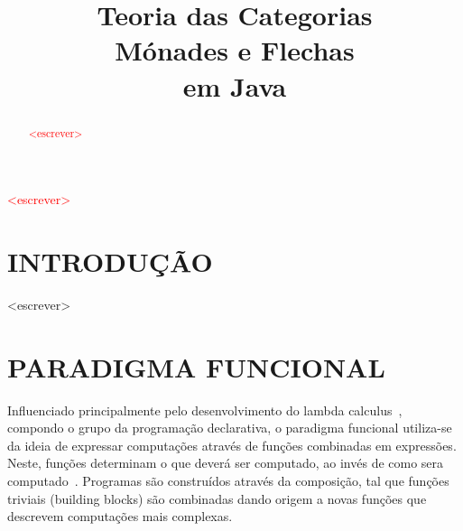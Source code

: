 \documentclass[10pt, conference]{IEEEtran}
\begin{document}

\title { 
	Teoria das Categorias \\
	Mónades e Flechas \\
	em Java 
}

\author{

}
					  
\maketitle

\thispagestyle{plain}
\pagestyle{plain}

\begin{abstract}

\textcolor{red}{<escrever>}

\end{abstract}

\begin{IEEEkeywords}

\textcolor{red}{<escrever>}

\end{IEEEkeywords}

\section{INTRODUÇÃO}
\label{sec:intro}

<escrever>

\section{PARADIGMA FUNCIONAL}
\label{sec:func-para}

Influenciado principalmente pelo desenvolvimento do lambda calculus~\cite{hudak1989conception}, compondo o grupo da programação declarativa, o paradigma funcional utiliza-se da ideia de expressar computações através de funções combinadas em expressões. Neste, funções determinam o que deverá ser computado, ao invés de como sera computado~\cite{louden2011programming}. Programas são construídos através da composição, tal que funções triviais (building blocks) são combinadas dando origem a novas funções que descrevem computações mais complexas.
\end{document}
